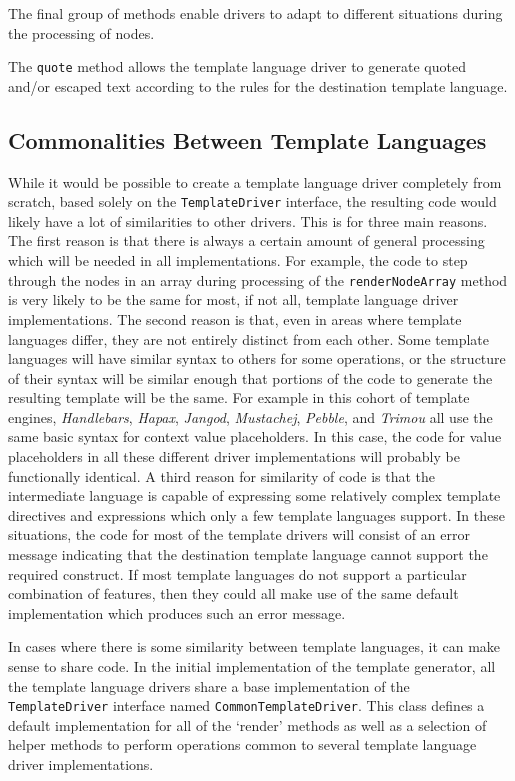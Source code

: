 The final group of methods enable drivers to adapt to different situations during the processing of nodes.

The \verb!quote! method allows the template language driver to generate quoted and/or escaped text according to the rules for the destination template language.

\subsection*{Commonalities Between Template Languages}

While it would be possible to create a template language driver completely from scratch, based solely on the \verb!TemplateDriver! interface, the resulting code would likely have a lot of similarities to other drivers. This is for three main reasons. The first reason is that there is always a certain amount of general processing which will be needed in all implementations. For example, the code to step through the nodes in an array during processing of the \verb!renderNodeArray! method is very likely to be the same for most, if not all, template language driver implementations. The second reason is that, even in areas where template languages differ, they are not entirely distinct from each other. Some template languages will have similar syntax to others for some operations, or the structure of their syntax will be similar enough that portions of the code to generate the resulting template will be the same. For example in this cohort of template engines, \emph{Handlebars}, \emph{Hapax}, \emph{Jangod}, \emph{Mustachej}, \emph{Pebble}, and \emph{Trimou} all use the same basic syntax for context value placeholders. In this case, the code for value placeholders in all these different driver implementations will probably be functionally identical. A third reason for similarity of code is that the intermediate language is capable of expressing some relatively complex template directives and expressions which only a few template languages support. In these situations, the code for most of the template drivers will consist of an error message indicating that the destination template language cannot support the required construct. If most template languages do not support a particular combination of features, then they could all make use of the same default implementation which produces such an error message.

In cases where there is some similarity between template languages, it can make sense to share code. In the initial implementation of the template generator, all the template language drivers share a base implementation of the \verb!TemplateDriver! interface named \verb!CommonTemplateDriver!. This class defines a default implementation for all of the `render' methods as well as a selection of helper methods to perform operations common to several template language driver implementations.


